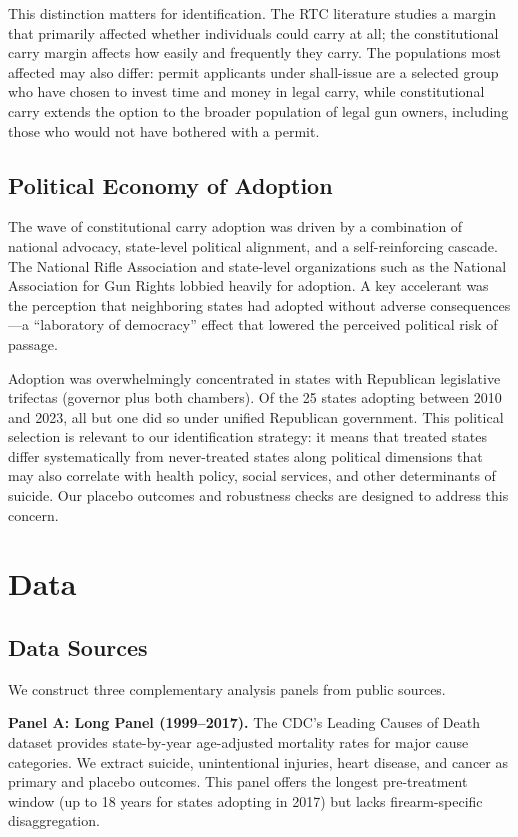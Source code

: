 \documentclass[12pt]{article}
\begin{document}
This distinction matters for identification. The RTC literature studies a margin that primarily affected whether individuals could carry at all; the constitutional carry margin affects how easily and frequently they carry. The populations most affected may also differ: permit applicants under shall-issue are a selected group who have chosen to invest time and money in legal carry, while constitutional carry extends the option to the broader population of legal gun owners, including those who would not have bothered with a permit.

\subsection{Political Economy of Adoption}

The wave of constitutional carry adoption was driven by a combination of national advocacy, state-level political alignment, and a self-reinforcing cascade. The National Rifle Association and state-level organizations such as the National Association for Gun Rights lobbied heavily for adoption. A key accelerant was the perception that neighboring states had adopted without adverse consequences---a ``laboratory of democracy'' effect that lowered the perceived political risk of passage.

Adoption was overwhelmingly concentrated in states with Republican legislative trifectas (governor plus both chambers). Of the 25 states adopting between 2010 and 2023, all but one did so under unified Republican government. This political selection is relevant to our identification strategy: it means that treated states differ systematically from never-treated states along political dimensions that may also correlate with health policy, social services, and other determinants of suicide. Our placebo outcomes and robustness checks are designed to address this concern.

\section{Data}\label{sec:data}

\subsection{Data Sources}

We construct three complementary analysis panels from public sources.

\textbf{Panel A: Long Panel (1999--2017).} The CDC's Leading Causes of Death dataset provides state-by-year age-adjusted mortality rates for major cause categories. We extract suicide, unintentional injuries, heart disease, and cancer as primary and placebo outcomes. This panel offers the longest pre-treatment window (up to 18 years for states adopting in 2017) but lacks firearm-specific disaggregation.
\end{document}
